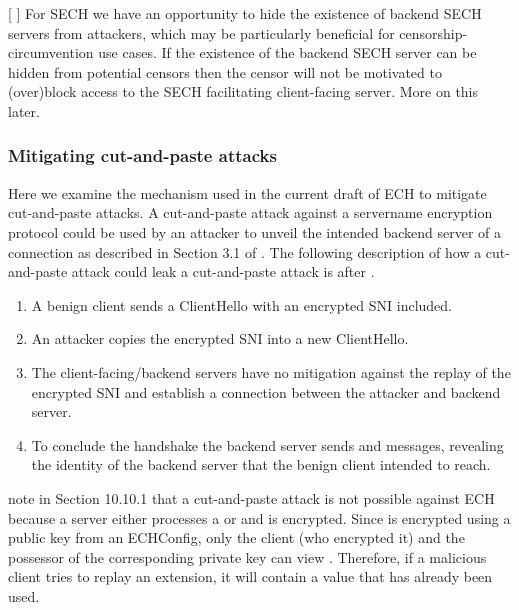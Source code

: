 [ ] For SECH we have an opportunity to hide the existence of backend SECH servers from attackers, which may be particularly beneficial for censorship-circumvention use cases. If the existence of the backend SECH server can be hidden from potential censors then the censor will not be motivated to (over)block access to the SECH facilitating client-facing server. More on this later.

\subsubsection{Mitigating cut-and-paste attacks}
Here we examine the mechanism used in the current draft of ECH to mitigate cut-and-paste attacks. A cut-and-paste attack against a servername encryption protocol could be used by an attacker to unveil the intended backend server of a connection as described in Section 3.1 of \cite{rfc8744-issues}. The following description of how a cut-and-paste attack could leak a cut-and-paste attack is after \cite{rfc8744-issues}.
\begin{enumerate}
    \item A benign client sends a ClientHello with an encrypted SNI included.
    \item An attacker copies the encrypted SNI into a new ClientHello.
    \item The client-facing/backend servers have no mitigation against the replay of the encrypted SNI and establish a connection between the attacker and backend server.
    \item To conclude the handshake the backend server sends  and  messages, revealing the identity of the backend server that the benign client intended to reach. 
\end{enumerate}
\cite{esni} note in Section 10.10.1 that a cut-and-paste attack is not possible against ECH because a server either processes a  or  and  is encrypted. Since  is encrypted using a public key from an ECHConfig, only the client (who encrypted it) and the possessor of the corresponding private key can view . Therefore, if a malicious client tries to replay an  extension, it will contain a  value that has already been used.



